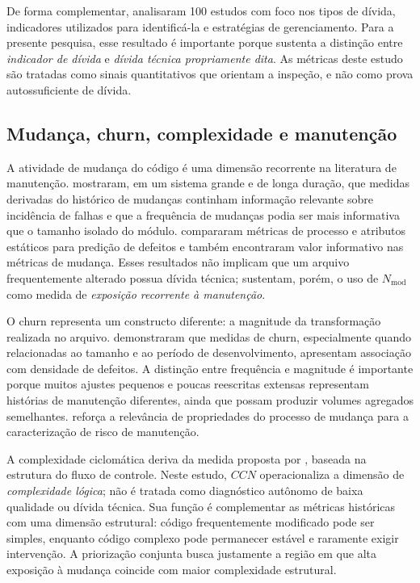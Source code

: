\documentclass[12pt]{article}
\newcommand{\Nmod}{\ensuremath{N_{\mathrm{mod}}}}
\newcommand{\CCN}{\ensuremath{CCN}}
\begin{document}
De forma complementar, \cite{alves2016identification} analisaram 100 estudos com foco nos tipos de dívida, indicadores utilizados para identificá-la e estratégias de gerenciamento. Para a presente pesquisa, esse resultado é importante porque sustenta a distinção entre \emph{indicador de dívida} e \emph{dívida técnica propriamente dita}. As métricas deste estudo são tratadas como sinais quantitativos que orientam a inspeção, e não como prova autossuficiente de dívida.

\subsection{Mudança, churn, complexidade e manutenção}

A atividade de mudança do código é uma dimensão recorrente na literatura de manutenção. \cite{graves2000changehistory} mostraram, em um sistema grande e de longa duração, que medidas derivadas do histórico de mudanças continham informação relevante sobre incidência de falhas e que a frequência de mudanças podia ser mais informativa que o tamanho isolado do módulo. \cite{moser2008changemetrics} compararam métricas de processo e atributos estáticos para predição de defeitos e também encontraram valor informativo nas métricas de mudança. Esses resultados não implicam que um arquivo frequentemente alterado possua dívida técnica; sustentam, porém, o uso de \Nmod{} como medida de \emph{exposição recorrente à manutenção}.

O churn representa um constructo diferente: a magnitude da transformação realizada no arquivo. \cite{nagappan2005churn} demonstraram que medidas de churn, especialmente quando relacionadas ao tamanho e ao período de desenvolvimento, apresentam associação com densidade de defeitos. A distinção entre frequência e magnitude é importante porque muitos ajustes pequenos e poucas reescritas extensas representam histórias de manutenção diferentes, ainda que possam produzir volumes agregados semelhantes. \cite{hassan2009changecomplexity} reforça a relevância de propriedades do processo de mudança para a caracterização de risco de manutenção.

A complexidade ciclomática deriva da medida proposta por \cite{mccabe1976complexity}, baseada na estrutura do fluxo de controle. Neste estudo, \CCN{} operacionaliza a dimensão de \emph{complexidade lógica}; não é tratada como diagnóstico autônomo de baixa qualidade ou dívida técnica. Sua função é complementar as métricas históricas com uma dimensão estrutural: código frequentemente modificado pode ser simples, enquanto código complexo pode permanecer estável e raramente exigir intervenção. A priorização conjunta busca justamente a região em que alta exposição à mudança coincide com maior complexidade estrutural.
\end{document}
